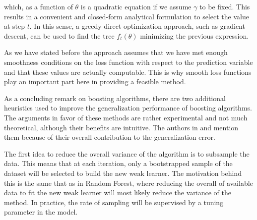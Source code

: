 which, as a function of $\theta$ is a quadratic equation if we assume $\gamma$ to be fixed. This results in a convenient and closed-form analytical formulation to select the value at step $t$. In this sense, a greedy direct optimization approach, such as gradient descent, can be used to find the tree $f_t(\theta)$ minimizing the previous expression.

As we have stated before the approach assumes that we have met enough smoothness conditions on the loss function with respect to the prediction variable
and that these values are actually computable. This is why smooth loss functions play an important part here in providing a feasible method.





As a concluding remark on boosting algorithms, there are two additional heuristics used to improve the generalization performance of boosting algorithms. The arguments in favor of these methods are rather experimental and not much theoretical, although their benefits are intuitive. The authors in \textcite{hastie-elemstatslearn} and \textcite{bishop-patternRecognition} mention them because of their overall contribution to the generalization error.

The first idea to reduce the overall variance of the algorithm is to subsample the data. This means that at each iteration, only a bootstrapped sample of the dataset will be selected to build the new weak learner. The motivation behind this is the same that as in Random Forest, where reducing the overall of available data to fit the new weak learner will most likely reduce the variance of the method. In practice, the rate of sampling will be supervised by a tuning parameter in the model.

